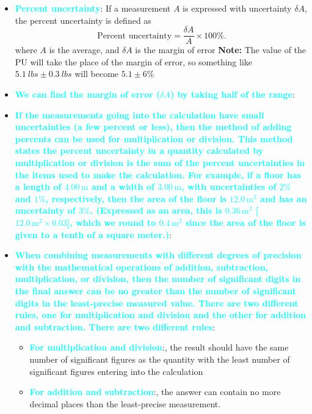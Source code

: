 \documentclass{report}
\begin{document}
\begin{itemize}
\begin{itemize}
            \end{itemize}
        \item \textbf{\textcolor{cyan}{Percent uncertainty}}: If a measurement \( A \) is expressed with uncertainty \( \delta A \), the percent uncertainty is defined as
            \[
                \text{Percent uncertainty} = \frac{\delta A}{A} \times 100\%.
            \]
            where $A$ is the average, and $\delta A$ is the margin of error
            \bigbreak \noindent 
            \textbf{Note:} The value of the PU will take the place of the margin of error, so something like $5.1\ lbs \pm 0.3\ lbs $ will become $5.1 \pm 6 \% $
        \item \textbf{\textcolor{cyan}{We can find the margin of error ($\delta A$) by taking half of the range}}:
        \item \textbf{\textcolor{cyan}{If the measurements going into the calculation have small uncertainties (a few percent or less), then the method of adding percents can be used for multiplication or division. This method states the percent uncertainty in a quantity calculated by multiplication or division is the sum of the percent uncertainties in the items used to make the calculation. For example, if a floor has a length of \(4.00 \, \text{m}\) and a width of \(3.00 \, \text{m}\), with uncertainties of \(2\%\) and \(1\%\), respectively, then the area of the floor is \(12.0 \, \text{m}^2\) and has an uncertainty of \(3\%\). (Expressed as an area, this is \(0.36 \, \text{m}^2\) [\(12.0 \, \text{m}^2 \times 0.03\)], which we round to \(0.4 \, \text{m}^2\) since the area of the floor is given to a tenth of a square meter.)}}:
        \item \textbf{\textcolor{cyan}{    When combining measurements with different degrees of precision with the mathematical operations of addition, subtraction, multiplication, or division, then the number of significant digits in the final answer can be no greater than the number of significant digits in the least-precise measured value. There are two different rules, one for multiplication and division and the other for addition and subtraction. There are two different rules}}:
            \begin{itemize}
                \item \textbf{\textcolor{cyan}{For multiplication and division}}:, the result should have the same number of significant figures as the quantity with the least number of significant figures entering into the calculation 
                \item \textbf{\textcolor{cyan}{For addition and subtraction}}:, the answer can contain no more decimal places than the least-precise measurement.

\end{itemize}
\end{itemize}
\end{document}
